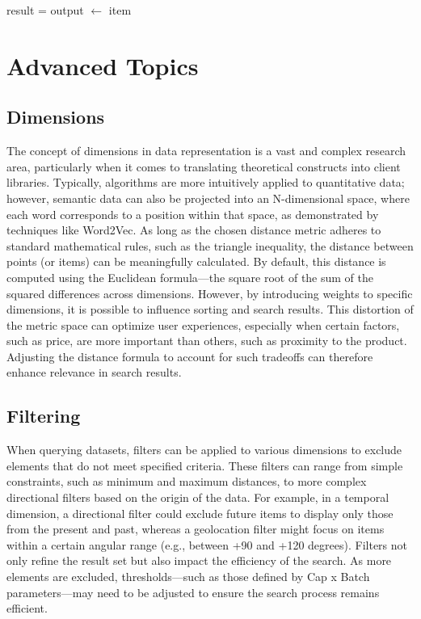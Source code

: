 \documentclass[11pt]{article}
\begin{document}
\begin{algorithm}[H]
\caption{Query and Stream Functions}
\begin{algorithmic}[1]
        \State result = 
        \State {}
    \EndFor
    \State {}
    \State {}
\EndFunction
\State
{}
        \State output $\gets$ item
    \EndFor
    \State {}
    \State {}
\EndFunction
\end{algorithmic}
\end{algorithm}

\section*{Advanced Topics}

\subsection*{Dimensions}
The concept of dimensions in data representation is a vast and complex research area, particularly when it comes to translating theoretical constructs into client libraries. Typically, algorithms are more intuitively applied to quantitative data; however, semantic data can also be projected into an N-dimensional space, where each word corresponds to a position within that space, as demonstrated by techniques like Word2Vec. As long as the chosen distance metric adheres to standard mathematical rules, such as the triangle inequality, the distance between points (or items) can be meaningfully calculated. By default, this distance is computed using the Euclidean formula—the square root of the sum of the squared differences across dimensions. However, by introducing weights to specific dimensions, it is possible to influence sorting and search results. This distortion of the metric space can optimize user experiences, especially when certain factors, such as price, are more important than others, such as proximity to the product. Adjusting the distance formula to account for such tradeoffs can therefore enhance relevance in search results.

\subsection*{Filtering}
When querying datasets, filters can be applied to various dimensions to exclude elements that do not meet specified criteria. These filters can range from simple constraints, such as minimum and maximum distances, to more complex directional filters based on the origin of the data. For example, in a temporal dimension, a directional filter could exclude future items to display only those from the present and past, whereas a geolocation filter might focus on items within a certain angular range (e.g., between +90 and +120 degrees). Filters not only refine the result set but also impact the efficiency of the search. As more elements are excluded, thresholds—such as those defined by Cap x Batch parameters—may need to be adjusted to ensure the search process remains efficient.
\end{document}

